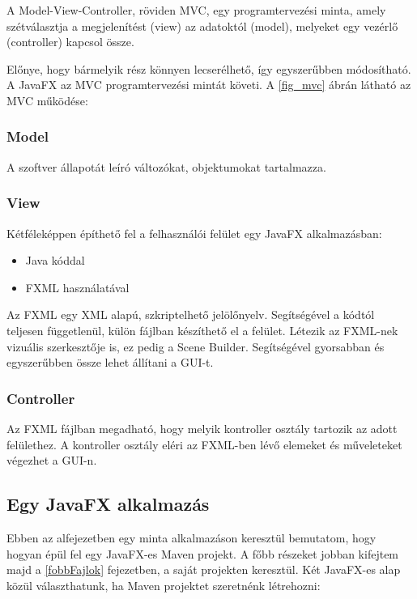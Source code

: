 A Model-View-Controller, röviden MVC, egy programtervezési minta, amely szétválasztja a megjelenítést (view) az adatoktól (model), melyeket egy vezérlő (controller) kapcsol össze. 

Előnye, hogy bármelyik rész könnyen lecserélhető, így egyszerűbben módosítható.
A JavaFX az MVC programtervezési mintát követi.
A \ref{fig_mvc} ábrán látható az MVC működése:



\subsubsection*{Model} 

A szoftver állapotát leíró változókat, objektumokat tartalmazza. 

\subsubsection*{View}

Kétféleképpen építhető fel a felhasználói felület egy JavaFX alkalmazásban: 

\begin{itemize}
\setlength\itemsep{0em}
\item Java kóddal 
\item FXML használatával 
\end{itemize}

Az FXML egy XML alapú, szkriptelhető jelölőnyelv.
Segítségével a kódtól teljesen függetlenül, külön fájlban készíthető el a felület.
Létezik az FXML-nek vizuális szerkesztője is, ez pedig a Scene Builder.
Segítségével gyorsabban és egyszerűbben össze lehet állítani a GUI-t. \cite{javafx}

\subsubsection*{Controller}

Az FXML fájlban megadható, hogy melyik kontroller osztály tartozik az adott felülethez.
A kontroller osztály eléri az FXML-ben lévő elemeket és műveleteket végezhet a GUI-n.


\subsection{Egy JavaFX alkalmazás}\label{javafxMinta}

Ebben az alfejezetben egy minta alkalmazáson keresztül bemutatom, hogy hogyan épül fel egy JavaFX-es Maven projekt.
A főbb részeket jobban kifejtem majd a \ref{fobbFajlok} fejezetben, a saját projekten keresztül.
Két JavaFX-es alap közül választhatunk, ha Maven projektet szeretnénk létrehozni: 

